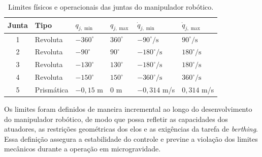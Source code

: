 \begin{table}[ht]
\centering
\caption{Limites físicos e operacionais das juntas do manipulador robótico.}
\label{tab:limites_juntasPosVelocidade}
\begin{tabular}{clllll}
\toprule
\textbf{Junta} & \textbf{Tipo} & $q_{j,\min}$ & $q_{j,\max}$ & $\dot{q}_{j,\min}$ & $\dot{q}_{j,\max}$ \\
\midrule
1 & Revoluta & $-360^\circ$ & $360^\circ$ & $-90^\circ/\text{s}$ & $90^\circ/\text{s}$ \\
2 & Revoluta & $-90^\circ$ & $90^\circ$ & $-180^\circ/\text{s}$ & $180^\circ/\text{s}$ \\
3 & Revoluta & $-130^\circ$ & $130^\circ$ & $-180^\circ/\text{s}$ & $180^\circ/\text{s}$ \\
4 & Revoluta & $-150^\circ$ & $150^\circ$ & $-360^\circ/\text{s}$ & $360^\circ/\text{s}$ \\
5 & Prismática & $-0{,}15$ m & $0$ m & $-0{,}314$ m/s & $0{,}314$ m/s \\
\bottomrule
\end{tabular}
\end{table}

Os limites foram definidos de maneira incremental ao longo do desenvolvimento do manipulador robótico, de modo que possa refletir as capacidades dos atuadores, as restrições geométricas dos elos e as exigências da tarefa de \emph{berthing}.
Essa definição assegura a estabilidade do controle e previne a violação dos limites mecânicos durante a operação em microgravidade.




